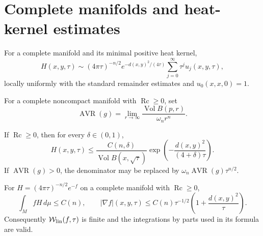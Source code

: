 \section{Complete manifolds and heat-kernel estimates}

\begin{theorem}
\label{thm:chow-ii-ch16-heat-parametrix}
For a complete manifold and its minimal positive heat kernel,
\[
H(x,y,\tau)\sim(4\pi\tau)^{-n/2}e^{-d(x,y)^2/(4\tau)}
 \sum_{j=0}^{\infty}\tau^ju_j(x,y,\tau),
\]
locally uniformly with the standard remainder estimates and
$u_0(x,x,0)=1$.
\end{theorem}

\begin{definition}
\label{def:chow-ii-ch16-avr}
For a complete noncompact manifold with $\operatorname{Rc}\ge0$, set
\[
\operatorname{AVR}(g)=\lim_{r\to\infty}
 \frac{\operatorname{Vol}B(p,r)}{\omega_nr^n}.
\]
\end{definition}

\begin{theorem}
\label{thm:chow-ii-ch16-heat-upper-bound}
If $\operatorname{Rc}\ge0$, then for every $\delta\in(0,1)$,
\[
H(x,y,\tau)\le\frac{C(n,\delta)}{\operatorname{Vol}B(x,\sqrt\tau)}
 \exp\!\left(-\frac{d(x,y)^2}{(4+\delta)\tau}\right).
\]
If $\operatorname{AVR}(g)>0$, the denominator may be replaced by
$\omega_n\operatorname{AVR}(g)\tau^{n/2}$.
\end{theorem}

\begin{corollary}
\label{cor:chow-ii-ch16-heat-integrability}
For $H=(4\pi\tau)^{-n/2}e^{-f}$ on a complete manifold with
$\operatorname{Rc}\ge0$,
\[
\int_M fH\,d\mu\le C(n),\qquad
|\nabla f|(x,y,\tau)\le C(n)\tau^{-1/2}\left(1+\frac{d(x,y)^2}{\tau}\right).
\]
Consequently $\mathcal W_{\rm lin}(f,\tau)$ is finite and the integrations by
parts used in its formula are valid.
\end{corollary}

